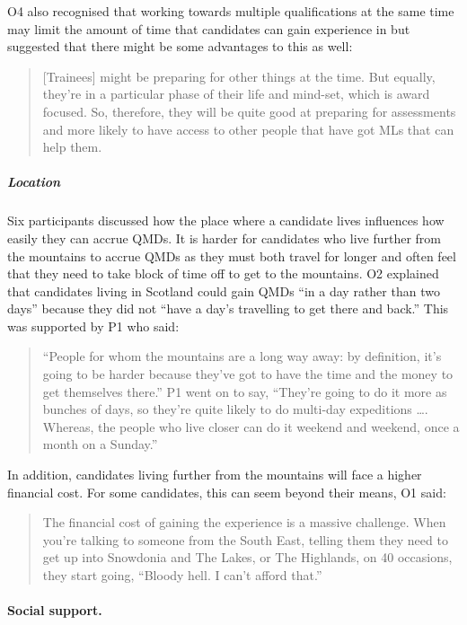 \documentclass[a4paper,]{book}
\let\oldparagraph\paragraph
\renewcommand{\paragraph}[1]{\oldparagraph{#1}\mbox{}}
\let\oldsubparagraph\subparagraph
\renewcommand{\subparagraph}[1]{\oldsubparagraph{#1}\mbox{}}
\begin{document}
O4 also recognised that working towards multiple qualifications at the same time may limit the amount of time that candidates can gain experience in but suggested that there might be some advantages to this as well:

\begin{quote}
{[}Trainees{]} might be preparing for other things at the time. But equally, they're in a particular phase of their life and mind-set, which is award focused. So, therefore, they will be quite good at preparing for assessments and more likely to have access to other people that have got MLs that can help them.
\end{quote}

\hypertarget{location}{%
\subparagraph{Location}\label{location}}

Six participants discussed how the place where a candidate lives influences how easily they can accrue QMDs. It is harder for candidates who live further from the mountains to accrue QMDs as they must both travel for longer and often feel that they need to take block of time off to get to the mountains. O2 explained that candidates living in Scotland could gain QMDs ``in a day rather than two days'' because they did not ``have a day's travelling to get there and back.'' This was supported by P1 who said:

\begin{quote}
``People for whom the mountains are a long way away: by definition, it's going to be harder because they've got to have the time and the money to get themselves there.'' P1 went on to say, ``They're going to do it more as bunches of days, so they're quite likely to do multi-day expeditions \ldots{}. Whereas, the people who live closer can do it weekend and weekend, once a month on a Sunday.''
\end{quote}

In addition, candidates living further from the mountains will face a higher financial cost. For some candidates, this can seem beyond their means, O1 said:

\begin{quote}
The financial cost of gaining the experience is a massive challenge. When you're talking to someone from the South East, telling them they need to get up into Snowdonia and The Lakes, or The Highlands, on 40 occasions, they start going, ``Bloody hell. I can't afford that.''
\end{quote}

\hypertarget{social-support.}{%
\paragraph{Social support.}\label{social-support.}}
\end{document}
